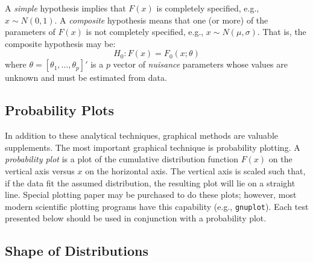 \documentclass[draft]{article}
\begin{document}
A {\em simple\/} hypothesis implies that \(F\left(x\right)\)
is completely specified, e.g., \(x\sim N\left(0,1\right)\).
A {\em composite\/} hypothesis means that 
one (or more) of the parameters of \(F\left(x\right)\)
is not completely specified, e.g.,  \(x\sim N\left(\mu,\sigma\right)\).
That is, the composite hypothesis may be:
\begin{displaymath}
H_0 : F\left(x\right) = F_0\left(x; \theta\right)
\end{displaymath}
where \(\theta=\left[\theta_1, \ldots,\theta_p\right]'\)
is a \(p\) vector of \emph{nuisance} parameters whose values
are unknown and must be estimated from data. 


\subsection{Probability Plots}

In addition to these analytical techniques, graphical
methods are valuable supplements. The most important
graphical technique is probability plotting. A \emph{probability plot}
\label{pplot}
is a plot of the cumulative distribution function \(F\left(x\right)\)
on the vertical axis versus \(x\) on the horizontal axis.
The vertical axis is scaled such that, if the data fit
the assumed distribution, the resulting plot will lie on
a straight line. Special plotting paper may be purchased
to do these plots; however, most modern scientific
plotting programs have this capability (e.g., {\tt gnuplot}).
Each test presented below
should be used in conjunction with a probability plot.
 
\subsection{Shape of Distributions}
\end{document}
